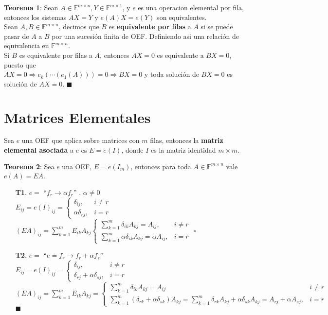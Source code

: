 \documentclass[11pt,a4paper]{article}
\newcommand*{\QEDA}{\null\nobreak\hfill\ensuremath{\blacksquare}}
\newcommand*{\QEDB}{\null\nobreak\hfill\ensuremath{\square}}
\begin{document}
\textbf{Teorema 1}: Sean $A \in \mathbb{F}^{m \times n}, Y \in \mathbb{F}^{m \times 1}$, y $e$ es una operacion elemental por fila, entonces los sistemas $AX=Y$ y $e(A)X = e(Y)$ son equivalentes.\\

Sean $A,B \in \mathbb{F}^{m \times n}$, decimos que $B$ es \textbf{equivalente por filas} a $A$ si se puede pasar de $A$ a $B$ por una sucesi\'on finita de OEF. Definiendo asi una relaci\'on de equivalencia en $\mathbb{F}^{m \times n}$.\\

Si $B$ es equivalente por filas a $A$, entonces $AX=0$ es equivalente a $BX=0$, puesto que\\ $AX=0 \Rightarrow e_k(\cdots(e_1(A))) = 0 \Rightarrow BX=0$ y toda soluci\'on de $BX=0$ es soluci\'on de $AX=0$. \QEDA

\section{Matrices Elementales}
Sea $e$ una OEF que aplica sobre matrices con $m$ filas, entonces la \textbf{matriz elemental asociada} a $e$ es $E = e(I)$, donde $I$ es la matriz identidad ${m \times m}$.

\textbf{Teorema 2}: Sea $e$ una OEF, $E = e(I_m)$, entonces para toda $A \in \mathbb{F}^{m \times n}$ vale $e(A) = EA$.
\begin{itemize}
\itemsep-0.3em
\item[\textbf{T1}.] $e =$ ``$f_r \rightarrow \alpha f_r$'' , $\alpha \not = 0$\\
$E_{ij} = e(I)_{ij} = \begin{cases} \delta_{ij}, & i \not = r \\ \alpha \delta_{rj}, & i = r \end{cases}$\\
$\displaystyle{(EA)_{ij} = \sum_{k=1}^m E_{ik}A_{kj} \begin{cases} 
\sum_{k=1}^m \delta_{ik}A_{kj} = A_{ij}, & i \not = r\\
\sum_{k=1}^m \alpha \delta_{ik}A_{kj} = \alpha A_{ij}, & i = r
\end{cases}}$ \QEDB\\
\item[\textbf{T2}.] $e =$ ``$e = f_r \rightarrow f_r + \alpha f_s$''\\
$E_{ij} = e(I)_{ij} = \begin{cases} \delta_{ij}, & i \not = r \\ \delta_{rj} + \alpha \delta_{sj}, & i = r \end{cases}$\\
$\displaystyle{(EA)_{ij} = \sum_{k = 1}^m E_{ik}A_{kj} = \begin{cases}
\sum_{k=1}^m \delta_{ik}A_{kj} = A_{ij} & i \not = r \\
\sum_{k=1}^m (\delta_{rk} + \alpha \delta_{sk})A_{kj} = 
\sum_{k=1}^m \delta_{rk}A_{kj} + \alpha \delta_{sk}A_{kj} = 
A_{rj} + \alpha A_{sj}, & i = r
\end{cases}  }$ \QEDA\\
\end{itemize}
\end{document}

